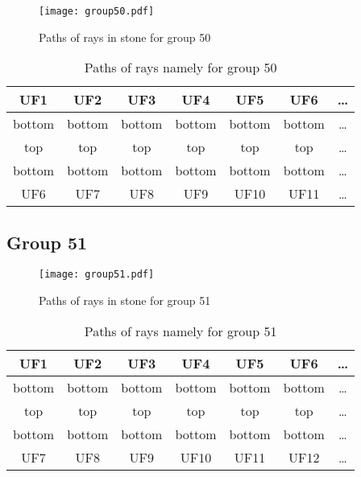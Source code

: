 \begin{figure}[h!]
\centering
\texttt{[image: group50.pdf]}
\caption{Paths of rays in stone for group 50}
\label{table:FigGroup50}
\end{figure}



\begin{table}[h!]
\centering
\begin{tabular}{|c|c|c|c|c|c|c|}
\hline
UF1 & UF2 & UF3 & UF4 & UF5 & UF6 & \dots \\
\hline
bottom & bottom & bottom & bottom & bottom & bottom & \dots \\
\hline
top & top & top & top & top & top & \dots \\
\hline
bottom & bottom & bottom & bottom & bottom & bottom & \dots \\
\hline
UF6 & UF7 & UF8 & UF9 & UF10 & UF11 & \dots \\
\hline
\end{tabular}
\caption{Paths of rays namely for group 50}
\label{table:TableGroup50}
\end{table}
\newpage
\subsection*{Group 51}






\begin{figure}[h!]
\centering
\texttt{[image: group51.pdf]}
\caption{Paths of rays in stone for group 51}
\label{table:FigGroup51}
\end{figure}



\begin{table}[h!]
\centering
\begin{tabular}{|c|c|c|c|c|c|c|}
\hline
UF1 & UF2 & UF3 & UF4 & UF5 & UF6 & \dots \\
\hline
bottom & bottom & bottom & bottom & bottom & bottom & \dots \\
\hline
top & top & top & top & top & top & \dots \\
\hline
bottom & bottom & bottom & bottom & bottom & bottom & \dots \\
\hline
UF7 & UF8 & UF9 & UF10 & UF11 & UF12 & \dots \\
\hline
\end{tabular}
\caption{Paths of rays namely for group 51}
\label{table:TableGroup51}
\end{table}
\newpage
